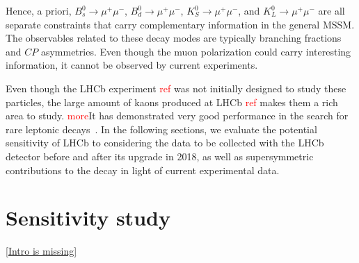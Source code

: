 Hence, a priori, $B_s^0\rightarrow\mu^+\mu^-$, $B_d^0\rightarrow\mu^+\mu^-$, $K_S^0\rightarrow\mu^+\mu^-$, and $K_L^0\rightarrow\mu^+\mu^-$ are all separate constraints that carry complementary information in the general MSSM. The observables related to these decay modes are typically branching fractions and $CP$ asymmetries. Even though the muon polarization could carry interesting information, it cannot be observed by current experiments.


Even though the LHCb experiment \textcolor{red}{ref} was not initially designed to study these particles, the large amount of kaons produced at LHCb \textcolor{red}{ref} makes them a rich area to study. \textcolor{red}{more}It has demonstrated very good performance in the search for rare leptonic \KS decays~\cite{Ksmm}. In the following sections, we evaluate the potential sensitivity of LHCb to \BRof\Kspizmm considering the data to be collected with the LHCb detector before and after its upgrade in 2018, as well as supersymmetric contributions to the decay \KsMuMu in light of current experimental data. 

\section{\Kspizmm Sensitivity study}
\ref{Intro is missing}\\
%







%
%
%
%


